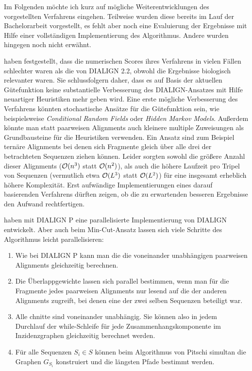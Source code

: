Im Folgenden möchte ich kurz auf mögliche Weiterentwicklungen des vorgestellten Verfahrens eingehen. Teilweise wurden diese bereits im Lauf der Bachelorarbeit vorgestellt, es fehlt aber noch eine Evaluierung der Ergebnisse mit Hilfe einer vollständigen Implementierung des Algorithmus. Andere wurden hingegen noch nicht erwähnt.

\cite{cpm10} haben festgestellt, dass die numerischen Scores ihres Verfahrens in vielen Fällen schlechter waren als die von DIALIGN 2.2, obwohl die Ergebnisse biologisch relevanter waren. Sie schlussfolgern daher, dass es auf Basis der aktuellen Gütefunktion keine substantielle Verbesserung des DIALIGN-Ansatzes mit Hilfe neuartiger Heuristiken mehr geben wird. Eine erste mögliche Verbesserung des Verfahrens könnten stochastische Ansätze für die Gütefunktion sein, wie beispielsweise \emph{Conditional Random Fields} oder \emph{Hidden Markov Models}. Außerdem könnte man statt paarweisen Alignments auch kleinere multiple Zuweisungen als Grundbausteine für die Heuristiken verwenden. Ein Ansatz sind zum Beispiel ternäre Alignments bei denen sich Fragmente gleich über alle drei der betrachteten Sequenzen ziehen können. Leider sorgten sowohl die größere Anzahl dieser Alignments ($\mathcal{O}(n^3)$ statt $\mathcal{O}(n^2)$), als auch die höhere Laufzeit pro Tripel von Sequenzen (vermutlich etwa $\mathcal{O}(L^3)$ statt $\mathcal{O}(L^2)$) für eine insgesamt erheblich höhere Komplexität. Erst aufwändige Implementierungen eines darauf basierenden Verfahrens dürften zeigen, ob die zu erwartenden besseren Ergebnisse den Aufwand rechtfertigen.

\cite{snkm04} haben mit DIALIGN P eine parallelisierte Implementierung von DIALIGN entwickelt. Aber auch beim Min-Cut-Ansatz lassen sich viele Schritte des Algorithmus leicht parallelisieren:

\begin{enumerate}[topsep=0pt,itemsep=-1ex,partopsep=1ex,parsep=1ex]
	\item Wie bei DIALIGN P kann man die die voneinander unabhängigen paarweisen Alignments gleichzeitig berechnen.
	\item Die Überlappgewichte lassen sich parallel bestimmen, wenn man für die Fragmente jedes paarweisen Alignments nur lesend auf die der anderen Alignments zugreift, bei denen eine der zwei selben Sequenzen beteiligt war.
	\item Alle chnitte sind voneinander unabhängig. Sie können also in jedem Durchlauf der while-Schleife für jede Zusammenhangskomponente im Inzidenzgraphen gleichzeitig berechnet werden.
	\item Für alle Sequenzen $S_i \in S$ können beim Algorithmus von Pitschi simultan die Graphen $G_{S_i}$ konstruiert und die längsten Pfade bestimmt werden.
\end{enumerate}

